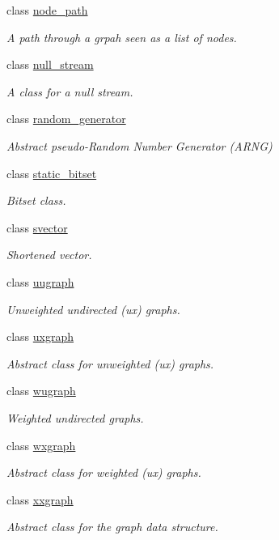 \begin{DoxyCompactItemize}
class \hyperlink{classlgraph_1_1utils_1_1node__path}{node\+\_\+path}
\begin{DoxyCompactList}\small\item\em A path through a grpah seen as a list of nodes. \end{DoxyCompactList}\item 
class \hyperlink{classlgraph_1_1utils_1_1null__stream}{null\+\_\+stream}
\begin{DoxyCompactList}\small\item\em A class for a null stream. \end{DoxyCompactList}\item 
class \hyperlink{classlgraph_1_1utils_1_1random__generator}{random\+\_\+generator}
\begin{DoxyCompactList}\small\item\em Abstract pseudo-\/\+Random Number Generator (A\+R\+NG) \end{DoxyCompactList}\item 
class \hyperlink{classlgraph_1_1utils_1_1static__bitset}{static\+\_\+bitset}
\begin{DoxyCompactList}\small\item\em Bitset class. \end{DoxyCompactList}\item 
class \hyperlink{classlgraph_1_1utils_1_1svector}{svector}
\begin{DoxyCompactList}\small\item\em Shortened vector. \end{DoxyCompactList}\item 
class \hyperlink{classlgraph_1_1utils_1_1uugraph}{uugraph}
\begin{DoxyCompactList}\small\item\em Unweighted undirected (ux) graphs. \end{DoxyCompactList}\item 
class \hyperlink{classlgraph_1_1utils_1_1uxgraph}{uxgraph}
\begin{DoxyCompactList}\small\item\em Abstract class for unweighted (ux) graphs. \end{DoxyCompactList}\item 
class \hyperlink{classlgraph_1_1utils_1_1wugraph}{wugraph}
\begin{DoxyCompactList}\small\item\em Weighted undirected graphs. \end{DoxyCompactList}\item 
class \hyperlink{classlgraph_1_1utils_1_1wxgraph}{wxgraph}
\begin{DoxyCompactList}\small\item\em Abstract class for weighted (ux) graphs. \end{DoxyCompactList}\item 
class \hyperlink{classlgraph_1_1utils_1_1xxgraph}{xxgraph}
\begin{DoxyCompactList}\small\item\em Abstract class for the graph data structure. \end{DoxyCompactList}\end{DoxyCompactItemize}
